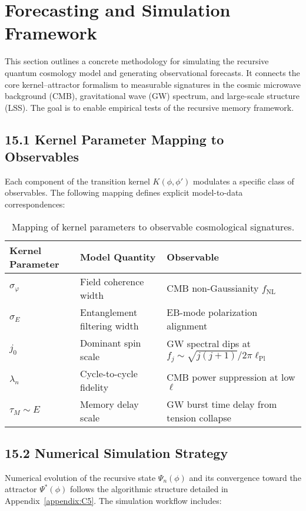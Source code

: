\section{Forecasting and Simulation Framework}
\label{sec:forecasting}

This section outlines a concrete methodology for simulating the recursive quantum cosmology model and generating observational forecasts. It connects the core kernel–attractor formalism to measurable signatures in the cosmic microwave background (CMB), gravitational wave (GW) spectrum, and large-scale structure (LSS). The goal is to enable empirical tests of the recursive memory framework.

\subsection{15.1 Kernel Parameter Mapping to Observables}

Each component of the transition kernel \( K(\phi, \phi') \) modulates a specific class of observables. The following mapping defines explicit model-to-data correspondences:

\begin{table}[H]
\centering
\begin{tabular}{lll}
\toprule
\textbf{Kernel Parameter} & \textbf{Model Quantity} & \textbf{Observable} \\
\midrule
\( \sigma_\varphi \) & Field coherence width & CMB non-Gaussianity \( f_{\text{NL}} \) \\
\( \sigma_E \) & Entanglement filtering width & EB-mode polarization alignment \\
\( j_0 \) & Dominant spin scale & GW spectral dips at \( f_j \sim \sqrt{j(j+1)} / 2\pi \ell_{\text{Pl}} \) \\
\( \lambda_n \) & Cycle-to-cycle fidelity & CMB power suppression at low \( \ell \) \\
\( \tau_M \sim E \) & Memory delay scale & GW burst time delay from tension collapse \\
\bottomrule
\end{tabular}
\caption{Mapping of kernel parameters to observable cosmological signatures.}
\end{table}

\subsection{15.2 Numerical Simulation Strategy}

Numerical evolution of the recursive state \( \Psi_n(\phi) \) and its convergence toward the attractor \( \Psi^*(\phi) \) follows the algorithmic structure detailed in Appendix~\ref{appendix:C5}. The simulation workflow includes:

